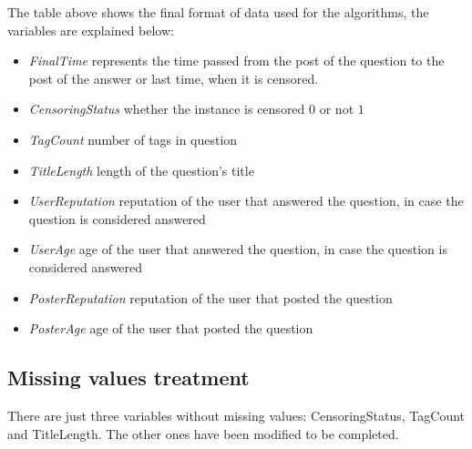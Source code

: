 \documentclass[11pt]{book} %
\begin{document}
    \begin{table}[!ht]
      \centering
      \caption{Final table format for SystemML algorithm input, extract from the processed file}
      \label{tab:final_table_format}
    \end{table}

    The table above shows the final format of data used for the algorithms, the variables are explained below:
    \begin{itemize}
      \item \emph{FinalTime} represents the time passed from the post of the question to the post of the answer or last time, when it is censored.
      \item \emph{CensoringStatus} whether the instance is censored $0$ or not $1$
      \item \emph{TagCount} number of tags in question
      \item \emph{TitleLength} length of the question's title
      \item \emph{UserReputation} reputation of the user that answered the question, in case the question is considered answered
      \item \emph{UserAge} age of the user that answered the question, in case the question is considered answered
      \item \emph{PosterReputation} reputation of the user that posted the question
      \item \emph{PosterAge} age of the user that posted the question
    \end{itemize}

  \subsection{Missing values treatment}

    There are just three variables without missing values: CensoringStatus, TagCount and TitleLength. The other ones have been modified to be completed.
\end{document}
